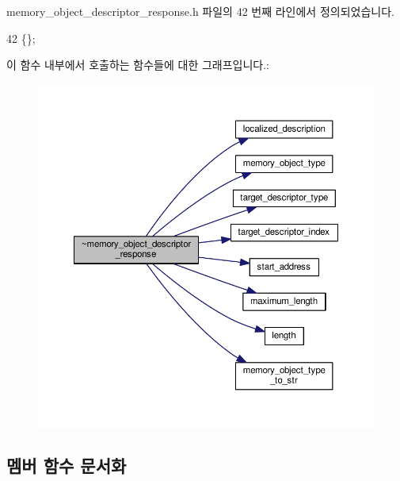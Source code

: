 memory\+\_\+object\+\_\+descriptor\+\_\+response.\+h 파일의 42 번째 라인에서 정의되었습니다.


\begin{DoxyCode}
42 \{\};
\end{DoxyCode}


이 함수 내부에서 호출하는 함수들에 대한 그래프입니다.\+:
\nopagebreak
\begin{figure}[H]
\begin{center}
\leavevmode
\includegraphics[width=350pt]{classavdecc__lib_1_1memory__object__descriptor__response_a6ab137e12f638f69ccd873afb04c5374_cgraph}
\end{center}
\end{figure}




\subsection{멤버 함수 문서화}
